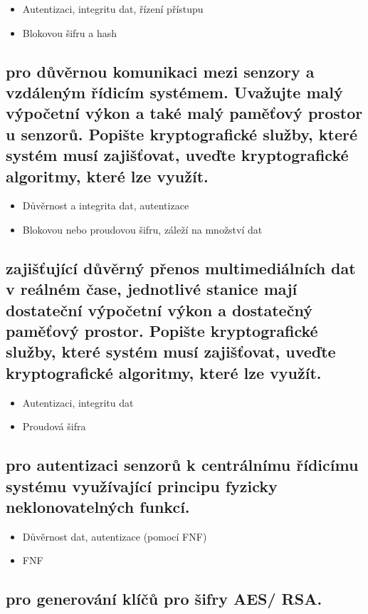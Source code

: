 \begin{itemize}
    \item Autentizaci, integritu dat, řízení přístupu
    \item Blokovou šifru a hash
\end{itemize}

\subsection{pro důvěrnou komunikaci mezi senzory a vzdáleným řídicím systémem. Uvažujte malý výpočetní výkon a také malý paměťový prostor u senzorů. Popište kryptografické služby, které systém musí zajišťovat, uveďte kryptografické algoritmy, které lze využít.}

\begin{itemize}
    \item Důvěrnost a integrita dat, autentizace
    \item Blokovou nebo proudovou šifru, záleží na množství dat
\end{itemize}

\subsection{zajišťující důvěrný přenos multimediálních dat v reálném čase, jednotlivé stanice mají dostateční výpočetní výkon a dostatečný paměťový prostor. Popište kryptografické služby, které systém musí zajišťovat, uveďte kryptografické algoritmy, které lze využít.}

\begin{itemize}
    \item Autentizaci, integritu dat
    \item Proudová šifra
\end{itemize}

\subsection{pro autentizaci senzorů k centrálnímu řídicímu systému využívající principu fyzicky neklonovatelných funkcí.}

\begin{itemize}
    \item Důvěrnost dat, autentizace (pomocí FNF)
    \item FNF
\end{itemize}

\subsection{pro generování klíčů pro šifry AES/ RSA.}

